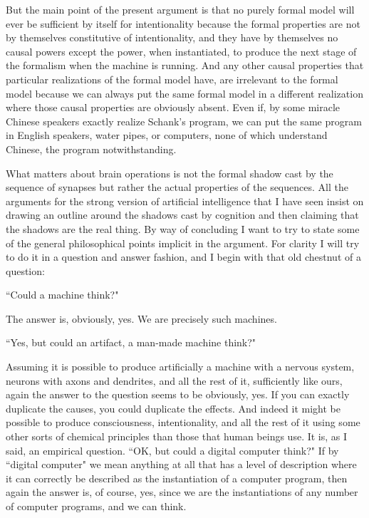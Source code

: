 But the main point of the present argument is that no purely formal model will ever be sufficient by itself for
intentionality because the formal properties are not by themselves constitutive of intentionality, and they have by
themselves no causal powers except the power, when instantiated, to produce the next stage of the formalism
when the machine is running. And any other causal properties that particular realizations of the formal model
have, are irrelevant to the formal model because we can always put the same formal model in a different
realization where those causal properties are obviously absent. Even if, by some miracle Chinese speakers
exactly realize Schank's program, we can put the same program in English speakers, water pipes, or
computers, none of which understand Chinese, the program notwithstanding.

What matters about brain operations is not the formal shadow cast by the sequence of synapses but rather the
actual properties of the sequences. All the arguments for the strong version of artificial intelligence that I have
seen insist on drawing an outline around the shadows cast by cognition and then claiming that the shadows are
the real thing. By way of concluding I want to try to state some of the general philosophical points implicit in the
argument. For clarity I will try to do it in a question and answer fashion, and I begin with that old chestnut of a
question:

``Could a machine think?"

The answer is, obviously, yes. We are precisely such machines.

``Yes, but could an artifact, a man-made machine think?"

Assuming it is possible to produce artificially a machine with a nervous system, neurons with axons and
dendrites, and all the rest of it, sufficiently like ours, again the answer to the question seems to be obviously, yes.
If you can exactly duplicate the causes, you could duplicate the effects. And indeed it might be possible to
produce consciousness, intentionality, and all the rest of it using some other sorts of chemical principles than
those that human beings use. It is, as I said, an empirical question. ``OK, but could a digital computer think?"
If by ``digital computer" we mean anything at all that has a level of description where it can correctly be
described as the instantiation of a computer program, then again the answer is, of course, yes, since we are the
instantiations of any number of computer programs, and we can think.

